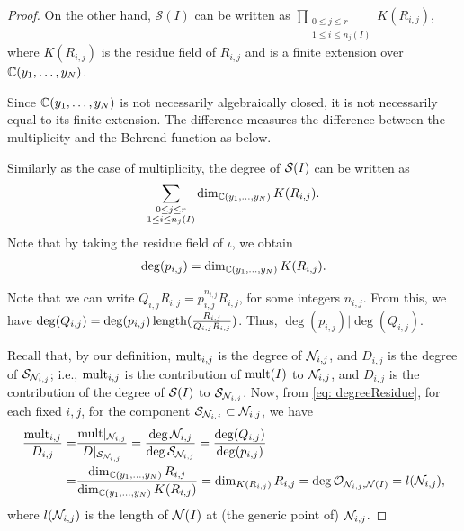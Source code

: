 \documentclass[11pt,a4paper,leqno,noamsfonts]{amsart}
\numberwithin{equation}{section}
\begin{document}
\begin{proof}
On the other hand, 
 $\mathcal{S}(I)$ can be written as $\prod_{\substack{0\leq j \leq r\\1\leq i \leq n_j(I)}}K(R_{i,j})$, where $K(R_{i,j})$ is the residue field of $R_{i,j}$ and is a finite extension over ${\mathbb{C}}(y_1,\ldots,y_N)$. 

Since ${\mathbb{C}}(y_1,\ldots,y_N)$ is not necessarily algebraically closed, it is not necessarily equal to its finite extension.  The difference measures the difference between the multiplicity and the Behrend function as below.

Similarly as the case of multiplicity, the degree of ${\mathcal S}(I)$ can be written as $$\sum_{\substack{0\leq j \leq r\\1\leq i \leq n_j(I)}}\dim_{{\mathbb{C}}(y_1,\ldots,y_N)}K(R_{i,j}).$$ Note that by taking the residue field of $\iota$,
we obtain \begin{align} \label{eq: degreeResidue}
\deg(p_{i,j})
=\dim_{{\mathbb{C}}(y_1,\ldots,y_N)}K(R_{i,j}).
\end{align}


Note that we can write $Q_{i,j}R_{i,j}=p_{i,j}^{n_{i,j}}R_{i,j}$, for some integers $n_{i,j}$. From this, we have $\deg(Q_{i,j})=\deg(p_{i,j})\operatorname{length}(\frac{R_{i,j}}{Q_{i,j}R_{i,j}})$. Thus, $\deg(p_{i,j})|\deg(Q_{i,j})$.

Recall that, by our definition, $\mathrm{mult}_{i,j}$ is the degree of  ${{\mathcal N}_{i,j}}$, and $D_{i,j}$ is the degree  of ${\mathcal S}_{{\mathcal N}_{i,j}}$; i.e., $\mathrm{mult}_{i,j}$ is the contribution of $\mathrm{mult}(I)$ to ${{\mathcal N}_{i,j}}$, and $D_{i,j}$ is the contribution of the degree of ${\mathcal S}(I)$ to ${\mathcal S}_{{\mathcal N}_{i,j}}$.
 Now, from \eqref{eq: degreeResidue}, for each fixed $i,j$, for the component ${\mathcal S}_{{\mathcal N}_{i,j}}\subset {\mathcal N}_{i,j}$, we have
\begin{equation}
    \begin{aligned} \label{eqn: multD}
\frac{\mathrm{mult}_{i,j}}{D_{i,j}}=&\frac{\mathrm{mult}|_{{\mathcal N}_{i,j}}}{D|_{{\mathcal S}_{{\mathcal N}_{i,j}}}}=\frac{\deg{{\mathcal N}_{i,j}}}{\deg{{\mathcal S}_{{\mathcal N}_{i,j}}}}=\frac{\deg(Q_{i,j})}{\deg(p_{i,j})}
\\
=&\frac{\dim_{{\mathbb{C}}(y_1,\ldots,y_N)}R_{i,j}}{\dim_{{\mathbb{C}}(y_1,\ldots,y_N)}K(R_{i,j})}=\dim_{K(R_{i,j})}R_{i,j}=\deg {\mathcal O}_{{\mathcal N}_{i,j},{\mathcal N}(I)}=l({\mathcal N}_{i,j}),
\end{aligned}
\end{equation}
where $l({\mathcal N}_{i,j})$ is the length of ${\mathcal N}(I)$ at (the generic point of) ${\mathcal N}_{i,j}$. 


\end{proof}
\end{document}
